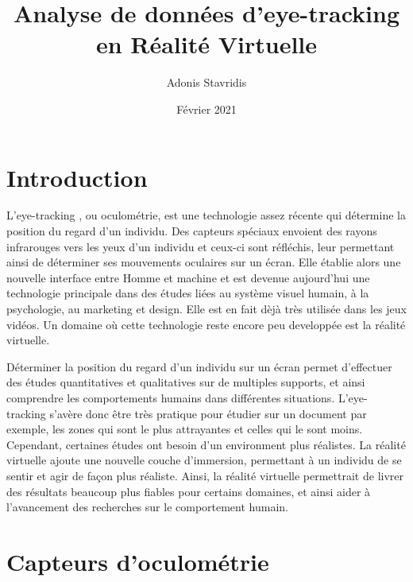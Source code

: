 \documentclass{article}
\title{\textbf{Analyse de données d’eye-tracking en Réalité Virtuelle}}
\author{\Large{Adonis Stavridis}}
\date{Février 2021}
\begin{document}

\maketitle
\tableofcontents
\pagebreak


\section{Introduction}
L'eye-tracking \cite{wiki:eye_tracking}, ou oculométrie, est une technologie
assez récente qui détermine la position du regard d'un individu. Des capteurs
spéciaux envoient des rayons infrarouges vers les yeux d'un individu et ceux-ci
sont réfléchis, leur permettant ainsi de déterminer ses mouvements oculaires
sur un écran. Elle établie alors une nouvelle interface entre Homme et machine
et est devenue aujourd'hui une technologie principale dans des études liées au
système visuel humain, à la psychologie, au marketing et design. Elle est en
fait dèjà très utilisée dans les jeux vidéos. Un domaine où cette technologie
reste encore peu developpée est la réalité virtuelle.

\bigskip
Déterminer la position du regard d'un individu sur un écran permet d'effectuer des études quantitatives et qualitatives sur de multiples supports, et ainsi
comprendre les comportements humains dans différentes situations. L'eye-tracking
s'avère donc être très pratique pour étudier sur un document par exemple, les 
zones qui sont le plus attrayantes et celles qui le sont moins. Cependant, 
certaines études ont besoin d'un environment plus réalistes. La réalité 
virtuelle ajoute une nouvelle couche d'immersion, permettant à un individu de
se sentir et agir de façon plus réaliste. Ainsi, la réalité virtuelle 
permettrait de livrer des résultats beaucoup plus fiables pour certains 
domaines, et ainsi aider à l'avancement des recherches sur le comportement
humain.


\section{Capteurs d'oculométrie}
\end{document}
